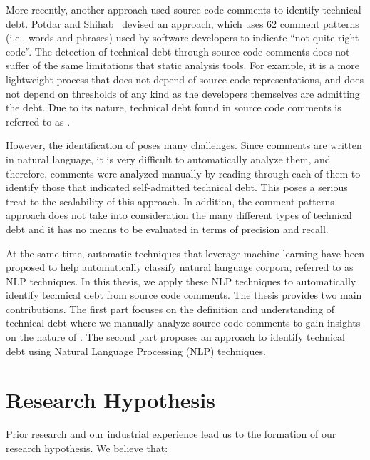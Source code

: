 More recently, another approach used source code comments to identify technical debt. Potdar and Shihab~\cite{Potdar2014ICSME} devised an approach, which uses 62 comment patterns (i.e., words and phrases) used by software developers to indicate ``not quite right code''. The detection of technical debt through source code comments does not suffer of the same limitations that static analysis tools. For example, it is a more lightweight process that does not depend of source code representations, and does not depend on thresholds of any kind as the developers themselves are admitting the debt. Due to its nature, technical debt found in source code comments is referred to as \emph{\SATD}.

However, the identification of \SATD poses many challenges. Since comments are written in natural language, it is very difficult to automatically analyze them, and therefore, comments were analyzed manually by reading through each of them to identify those that indicated self-admitted technical debt. This poses a serious treat to the scalability of this approach. In addition, the comment patterns approach does not take into consideration the many different types of technical debt and it has no means to be evaluated in terms of precision and recall. 

At the same time, automatic techniques that leverage machine learning have been proposed to help automatically classify natural language corpora, referred to as NLP techniques. In this thesis, we apply these NLP techniques to automatically identify technical debt from source code comments. The thesis provides two main contributions. The first part focuses on the definition and understanding of technical debt where we manually analyze source code comments to gain insights on the nature of \SATD. The second part proposes an approach to identify technical debt using Natural Language Processing (NLP) techniques.

\section{Research Hypothesis}

Prior research and our industrial experience lead us to the formation of our research hypothesis. We believe that:


